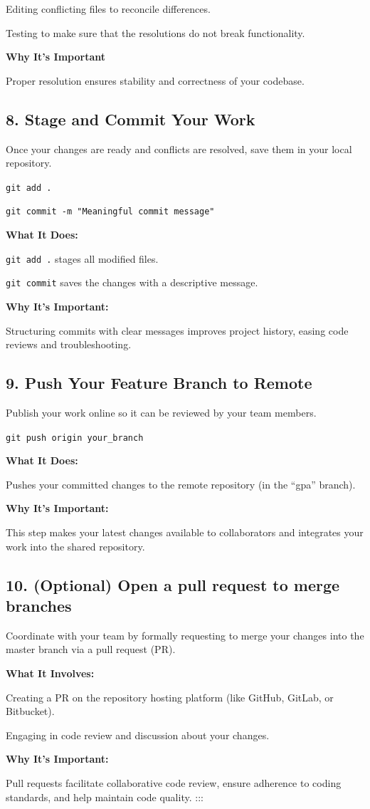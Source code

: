 \documentclass[
  letterpaper,
  DIV=11,
  numbers=noendperiod]{scrartcl}
\begin{document}
Editing conflicting files to reconcile differences.

Testing to make sure that the resolutions do not break functionality.

\textbf{Why It's Important}

Proper resolution ensures stability and correctness of your codebase.

\subsection{8. Stage and Commit Your
Work}\label{stage-and-commit-your-work}

Once your changes are ready and conflicts are resolved, save them in
your local repository.

\texttt{git\ add\ .}

\texttt{git\ commit\ -m\ "Meaningful\ commit\ message"}

\textbf{What It Does:}

\texttt{git\ add\ .} stages all modified files.

\texttt{git\ commit} saves the changes with a descriptive message.

\textbf{Why It's Important:}

Structuring commits with clear messages improves project history, easing
code reviews and troubleshooting.

\subsection{9. Push Your Feature Branch to
Remote}\label{push-your-feature-branch-to-remote}

Publish your work online so it can be reviewed by your team members.

\texttt{git\ push\ origin\ your\_branch}

\textbf{What It Does:}

Pushes your committed changes to the remote repository (in the ``gpa''
branch).

\textbf{Why It's Important:}

This step makes your latest changes available to collaborators and
integrates your work into the shared repository.

\subsection{10. (Optional) Open a pull request to merge
branches}\label{optional-open-a-pull-request-to-merge-branches}

Coordinate with your team by formally requesting to merge your changes
into the master branch via a pull request (PR).

\textbf{What It Involves:}

Creating a PR on the repository hosting platform (like GitHub, GitLab,
or Bitbucket).

Engaging in code review and discussion about your changes.

\textbf{Why It's Important:}

Pull requests facilitate collaborative code review, ensure adherence to
coding standards, and help maintain code quality. :::
\end{document}
